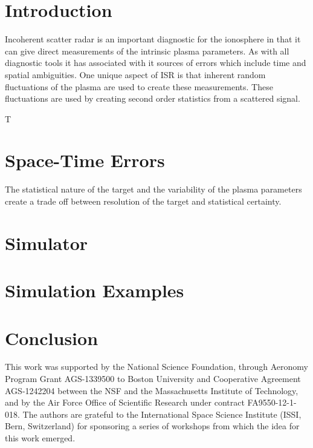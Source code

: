 \documentclass[draft,ras]{agutex}
\begin{document}
%
%

%

\begin{article}

\section{Introduction}
Incoherent scatter radar is an important diagnostic for the ionosphere in that it can give direct measurements of the intrinsic plasma parameters. As with all diagnostic tools it has associated with it sources of errors which include time and spatial ambiguities. One unique aspect of ISR is that inherent random fluctuations of the plasma are used to create these measurements. These fluctuations are used by creating second order statistics from a scattered signal.  

T
\section{Space-Time Errors}
The statistical nature of the target and the variability of the plasma parameters create a trade off between resolution of the target and statistical certainty. 

\section{Simulator}

\section{Simulation Examples}

\section{Conclusion}

\begin{acknowledgments}
This work was supported by the National Science Foundation, through Aeronomy Program Grant AGS-1339500 to Boston University and Cooperative Agreement AGS-1242204 between the NSF and the Massachusetts Institute of Technology, and by the Air Force Office of Scientific Research under contract FA9550-12-1-018.   The authors are grateful to the International Space Science Institute (ISSI, Bern, Switzerland) for sponsoring a series of workshops from which the idea for this work emerged. 


\end{acknowledgments}
\end{article}
\end{document}
